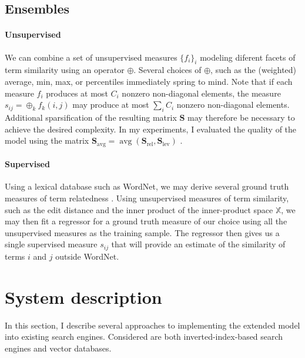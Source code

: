 \documentclass[
  digital, %
  notable, %
  lof,     %
  lot,     %
  nopalatino, color
]{fithesis3}
\newcommand{\op}[1]{\ensuremath{\operatorname{#1}}}
\newcommand{\avg}{\op{avg}}
\begin{document}
\subsection{Ensembles}
\paragraph{Unsupervised} We can combine a set of unsupervised measures
$\{f_i\}_i$ modeling diferent facets of term similarity using an operator
$\oplus$.  Several choices of $\oplus$, such as the
(weighted) average, min, max, or percentiles immediately spring to mind. Note
that if each measure $f_i$ produces at most $C_i$ nonzero non-diagonal
elements, the measure $s_{ij} = \oplus_k f_k(i, j)$ may produce at most $\sum_i
C_i$ nonzero non-diagonal elements. Additional sparsification of the resulting
matrix $\mathbf S$ may therefore be necessary to achieve the
desired complexity. In my experiments, I evaluated the quality of the model
using the matrix $\mathbf S_{\avg}=\avg(\mathbf S_{\textrm{rel}}, \mathbf
S_{\textrm{lev}})$
\index{.savg@$\mathbf S_{\avg}$|emph}.

\paragraph{Supervised} Using a lexical database such as WordNet,
we may derive several ground truth measures of term relatedness
\cite{Resnik:1995:UIC:1625855.1625914,Lin:1998:IDS:645527.657297,
DBLP:journals/corr/cmp-lg-9709008,Leacock1998,Wu:1994:VSL:981732.981751}. Using
unsupervised measures of term similarity, such as the edit distance and the
inner product of the inner-product space $\mathbb X$, we
may then fit a regressor for a ground truth measure of our choice using all the
unsupervised measures as the training sample. The regressor then gives us a
single supervised measure $s_{ij}$ that will provide an estimate of the
similarity of terms $i$ and $j$ outside WordNet.

\section{System description}
\label{sec:similarity-system}
In this section, I describe several approaches to implementing the extended
model into existing search engines. Considered
are both inverted-index-based search engines and vector
databases.
\end{document}
